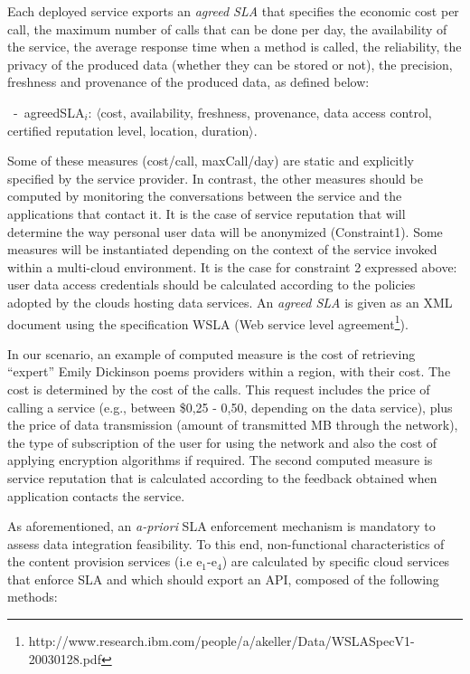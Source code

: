 Each deployed service exports an \textit{agreed SLA} that specifies the economic cost per call, the maximum number of calls that can be done per day, the availability of the service, the average response time when a method is called, the reliability, the privacy of the produced data (whether they can be stored or not), the precision, freshness and provenance of the produced data, as defined below:


\begin{trivlist}\sf\footnotesize
\item[~-~agreedSLA$_i$:] $\langle$cost, availability, freshness, provenance, data access control, certified reputation level, location, duration$\rangle$. 
 \end{trivlist}
 
Some of these measures ({cost/call, maxCall/day}) are static and explicitly specified by the service provider. 
In contrast, the other measures should be computed by monitoring the conversations between the service and the applications that contact it.  It is the case of service reputation that will determine the way personal user data will be anonymized (Constraint1).  Some measures will be instantiated depending on the context of  the service invoked within a multi-cloud environment. It is the case for constraint 2 expressed above:   user data access credentials should be calculated according to the policies adopted by the clouds  hosting  data services.
An \textit{agreed SLA} is given as an  XML document using the specification WSLA (Web service level agreement\footnote{\footnotesize http://www.research.ibm.com/people/a/akeller/\-Data/WSLASpecV1-20030128.pdf}).

In our scenario, an example of computed measure is the cost of retrieving ``expert'' Emily Dickinson poems providers within a region, with their cost. 
The cost is determined by the  cost of the calls. 
This request  includes the price of calling a service (e.g.,  between \$0,25 - 0,50, depending on the data service), plus the price of data transmission (amount of transmitted MB through the network), the type of subscription of the user for using the network and also the cost of applying encryption algorithms if required. 
The second computed measure is service reputation that is calculated according to the feedback obtained when application contacts the service.


As aforementioned, an \textit{a-priori} SLA enforcement mechanism is mandatory to assess data integration feasibility.
To this end, non-functional characteristics of the content provision services ({i.e e$_1$-e$_4$}) are calculated by specific cloud services that enforce SLA and which should export  an API, composed of the following methods:

